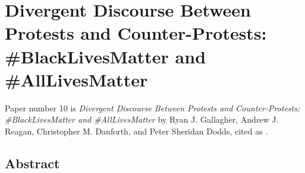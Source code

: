 




\clearpage

\section{Divergent Discourse Between Protests and Counter-Protests: \#BlackLivesMatter and \#AllLivesMatter}

Paper number 10 is \textit{Divergent Discourse Between Protests and Counter-Protests: \#BlackLivesMatter and \#AllLivesMatter} by Ryan J. Gallagher, Andrew J. Reagan, Christopher M. Danforth, and Peter Sheridan Dodds, cited as \cite{gallagher2016divergent}.

\subsection{Abstract}

